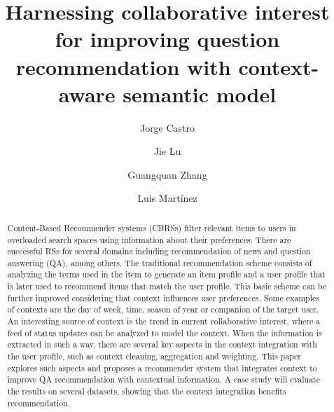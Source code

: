 \documentclass[preprint]{elsarticle}
\begin{document}
\title{Harnessing collaborative interest for improving question recommendation with context-aware semantic model}

\begin{spacing}{1.5}

\begin{frontmatter}

\author[addressjorge,addressjie]{Jorge Castro}

\author[addressjie]{Jie Lu}

\author[addressjie]{Guangquan Zhang}

\author[addressluis]{Luis Mart\'inez}

\address[addressjorge]{Department of Computer Science and Artificial Intelligence, University of Granada, Granada (Spain)}
\address[addressjie]{School of Software, University of Technology Sydney, Sydney (Australia)}
\address[addressluis]{Computer Science Department, University of Ja\'en, Ja\'en (Spain)}

\begin{abstract}

Content-Based Recommender systems (CBRSs) filter relevant items to users in overloaded search spaces using information about their preferences. There are successful RSs for several domains including recommendation of news and question answering (QA), among others. The traditional recommendation scheme consists of analyzing the terms used in the item to generate an item profile and a user profile that is later used to recommend items that match the user profile. This basic scheme can be further improved considering that context influences user preferences. Some examples of contexts are the day of week, time, season of year or companion of the target user. An interesting source of context is the trend in current collaborative interest, where a feed of status updates can be analyzed to model the context. When the information is extracted in such a way, there are several key aspects in the context integration with the user profile, such as context cleaning, aggregation and weighting. This paper explores such aspects and proposes a recommender system that integrates context to improve QA recommendation with contextual information. A case study will evaluate the results on several datasets, showing that the context integration benefits recommendation.


\end{abstract}
\end{frontmatter}
\end{spacing}
\end{document}
